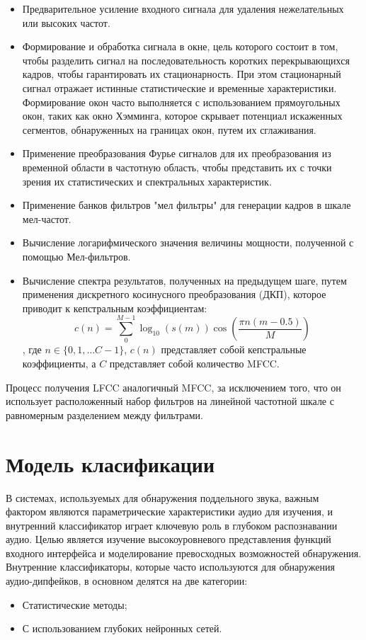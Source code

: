 \begin{itemize}
    \item Предварительное усиление входного сигнала для удаления нежелательных или высоких частот.
    \item Формирование и обработка сигнала в окне, цель которого состоит в том, чтобы разделить сигнал на последовательность коротких перекрывающихся кадров, чтобы гарантировать их стационарность. При этом стационарный сигнал отражает истинные статистические и временные характеристики. Формирование окон часто выполняется с использованием прямоугольных окон, таких как окно Хэмминга, которое скрывает потенциал искаженных сегментов, обнаруженных на границах окон, путем их сглаживания.
    \item Применение преобразования Фурье сигналов для их преобразования из временной области в частотную область, чтобы представить их с точки зрения их статистических и спектральных характеристик.
    \item Применение банков фильтров "мел фильтры" для генерации кадров в шкале мел-частот.
    \item Вычисление логарифмического значения величины мощности, полученной с помощью Мел-фильтров.
    \item Вычисление спектра результатов, полученных на предыдущем шаге, путем применения дискретного косинусного преобразования (ДКП), которое приводит к кепстральным коэффициентам: \[ c(n) = \sum_{0}^{M - 1} \log_{10}(s(m)) \cos(\frac{\pi n (m - 0.5)}{M})\], где \(n \in \{0, 1, \dots C-1\}\), \(c(n)\) представляет собой кепстральные коэффициенты, а \(C\) представляет собой количество MFCC.
\end{itemize}

Процесс получения LFCC аналогичный MFCC, за исключением того, что он использует расположенный набор фильтров на линейной частотной шкале с равномерным разделением между фильтрами.

\section{Модель класификации}

В системах, используемых для обнаружения поддельного звука, важным фактором являются параметрические характеристики аудио для изучения, и внутренний классификатор играет ключевую роль в глубоком распознавании аудио. Целью является изучение высокоуровневого представления функций входного интерфейса и моделирование превосходных возможностей обнаружения. Внутренние классификаторы, которые часто используются для обнаружения аудио-дипфейков, в основном делятся на две категории:
\begin{itemize}
    \item Статистические методы;
    \item С использованием глубоких нейронных сетей.
\end{itemize}

